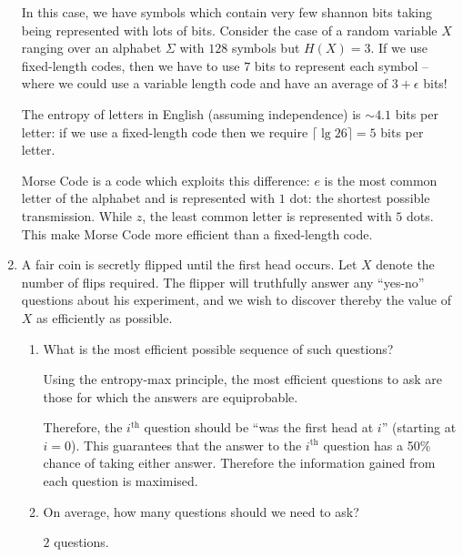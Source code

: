 \documentclass[10pt,\jkfside,a4paper]{article}
\begin{document}
\begin{enumerate}
    In this case, we have symbols which contain very few shannon bits taking being represented with lots of bits. Consider the case of a random variable $X$ ranging over an alphabet $\Sigma$ with $128$ symbols
    but $H(X) = 3$. If we use fixed-length codes, then we have to use $7$ bits to represent each symbol -- where we could use a variable length code and have an average of $3 + \epsilon$ bits!

    The entropy of letters in English (assuming independence) is $\sim 4.1$ bits per letter: if we use a fixed-length code then we require $\lceil\lg 26 \rceil = 5$ bits per letter.

    Morse Code is a code which exploits this difference: $e$ is the most common letter of the alphabet and is represented with $1$ dot: the shortest possible transmission. While $z$, the least common letter is
    represented with $5$ dots. This make Morse Code more efficient than a fixed-length code.

    \item A fair coin is secretly flipped until the first head occurs. Let $X$ denote the number of flips required. The flipper will truthfully answer any ``yes-no'' questions about his experiment, and we wish
    to discover thereby the value of $X$ as efficiently as possible.

    \begin{enumerate}

        \item What is the most efficient possible sequence of such questions?

        Using the entropy-max principle, the most efficient questions to ask are those for which the answers are equiprobable.

        Therefore, the $i^\mathrm{th}$ question should be ``was the first head at $i$'' (starting at $i = 0$). This guarantees that the answer to the $i^{\mathrm{th}}$ question has a 50\% chance of taking either
        answer. Therefore the information gained from each question is maximised.

        \item On average, how many questions should we need to ask?

        $2$ questions.


\end{enumerate}
\end{enumerate}
\end{document}
